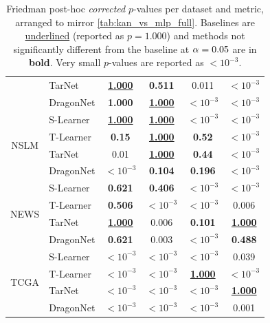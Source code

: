 \begin{table}[ht]
\begin{tabular}{c l cc cc}
& TarNet     & \underline{\textbf{1.000}} & \textbf{0.511} & 0.011 & $<10^{-3}$ \\
& DragonNet  & \textbf{1.000} & \underline{\textbf{1.000}} & $<10^{-3}$ & $<10^{-3}$ \\
\hline
\multirow{4}{*}{NSLM}
& S-Learner  & \underline{\textbf{1.000}} & \underline{\textbf{1.000}} & $< 10^{-3}$  & $< 10^{-3}$ \\
& T-Learner  & \textbf{0.15} & \underline{\textbf{1.000}} & \textbf{0.52} & $< 10^{-3}$\\
& TarNet     & 0.01 & \underline{\textbf{1.000}} & \textbf{0.44} & $< 10^{-3}$ \\
& DragonNet  & $< 10^{-3}$ & \textbf{0.104} & \textbf{0.196} & $< 10^{-3}$ \\
\hline
\multirow{4}{*}{NEWS}
& S-Learner  & \textbf{0.621} & {\textbf{0.406}} &  $< 10^{-3}$ &  $< 10^{-3}$ \\
& T-Learner  &  \textbf{0.506} &  $< 10^{-3}$ &  $< 10^{-3}$& 0.006\\
& TarNet & \underline{\textbf{1.000}} & 0.006 &  \textbf{0.101} & \underline{\textbf{1.000}} \\
& DragonNet  & \textbf{0.621} & 0.003 & $< 10^{-3}$ & \textbf{0.488} \\
\hline
\multirow{4}{*}{TCGA}
& S-Learner  & $< 10^{-3}$ & $< 10^{-3}$ & $< 10^{-3}$ & 0.039 \\
& T-Learner  & $< 10^{-3}$ & $< 10^{-3}$ & \underline{\textbf{1.000}} & $< 10^{-3}$\\
& TarNet     & $< 10^{-3}$ & $< 10^{-3}$ & $< 10^{-3}$ & \underline{\textbf{1.000}} \\
& DragonNet  & $< 10^{-3}$ & $< 10^{-3}$ & $< 10^{-3}$ & 0.001\\
\bottomrule
\end{tabular}
\caption{Friedman post-hoc \emph{corrected} $p$-values per dataset and metric, arranged to mirror \cref{tab:kan_vs_mlp_full}. Baselines are \underline{underlined} (reported as $p=1.000$) and methods not significantly different from the baseline at $\alpha=0.05$ are in \textbf{bold}. Very small $p$-values are reported as $<10^{-3}$.}
\label{tab:kan_vs_mlp_pvalues_consistent}
\end{table}




